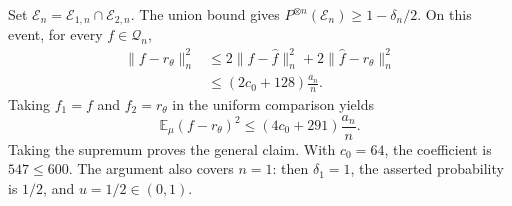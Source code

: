 Set \(\mathcal E_n=\mathcal E_{1,n}\cap\mathcal E_{2,n}\). The union bound gives \(P^{\otimes n}(\mathcal E_n)\ge1-\delta_n/2\). On this event, for every \(f\in\mathcal Q_n\),
\[
\begin{aligned}
\|f-r_\theta\|_n^2
&\le2\|f-\widehat f\|_n^2+2\|\widehat f-r_\theta\|_n^2\\
&\le(2c_0+128)\frac{a_n}{n}.
\end{aligned}
\]
Taking \(f_1=f\) and \(f_2=r_\theta\) in the uniform comparison yields
\[
\mathbb E_\mu(f-r_\theta)^2
\le(4c_0+291)\frac{a_n}{n}.
\]
Taking the supremum proves the general claim. With \(c_0=64\), the coefficient is \(547\le600\). The argument also covers \(n=1\): then \(\delta_1=1\), the asserted probability is \(1/2\), and \(u=1/2\in(0,1)\).